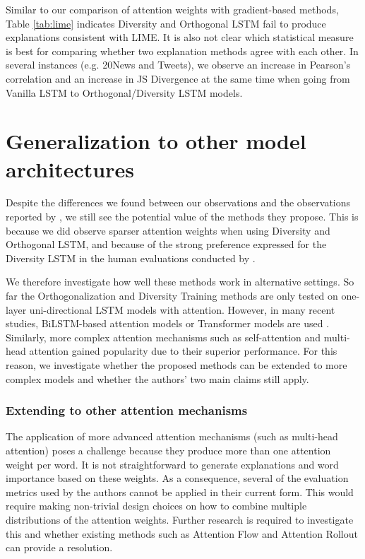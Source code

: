Similar to our comparison of attention weights with gradient-based methods, Table \ref{tab:lime} indicates Diversity and Orthogonal LSTM fail to produce explanations consistent with LIME.
It is also not clear which statistical measure is best for comparing whether two explanation methods agree with each other. In several instances (e.g. 20News and Tweets), we observe an increase in Pearson's correlation and an increase in JS Divergence at the same time when going from Vanilla LSTM to Orthogonal/Diversity LSTM models.

\section{Generalization to other model architectures}

Despite the differences we found between our observations and the observations reported by \citep{mohankumar_towards_2020}, we still see the potential value of the methods they propose.
This is because we did observe sparser attention weights when using Diversity and Orthogonal LSTM, and because of the strong preference expressed for the Diversity LSTM in the human evaluations conducted by \citet{mohankumar_towards_2020}.

We therefore investigate how well these methods work in alternative settings. So far the Orthogonalization and Diversity Training methods are only tested on one-layer uni-directional LSTM models with attention. However, in many recent studies, BiLSTM-based attention models or Transformer models are used  \citep{zhou2018nlp,lee2019ncuee,8554396}. Similarly, more complex attention mechanisms such as self-attention and multi-head attention \citep{vaswani_attention_2017} gained popularity due to their superior performance. For this reason, we investigate whether the proposed methods can be extended to more complex models and whether the authors' two main claims still apply.

\subsubsection{Extending to other attention mechanisms}
The application of more advanced attention mechanisms (such as multi-head attention) poses a challenge because they produce more than one attention weight per word. It is not straightforward to generate explanations and word importance based on these weights. As a consequence, several of the evaluation metrics used by the authors cannot be applied in their current form. This would require making non-trivial design choices on how to  combine multiple distributions of the attention weights.
Further research is required to investigate this and whether existing methods such as Attention Flow and Attention Rollout \citep{abnar_quantifying_2020} can provide a resolution. 

